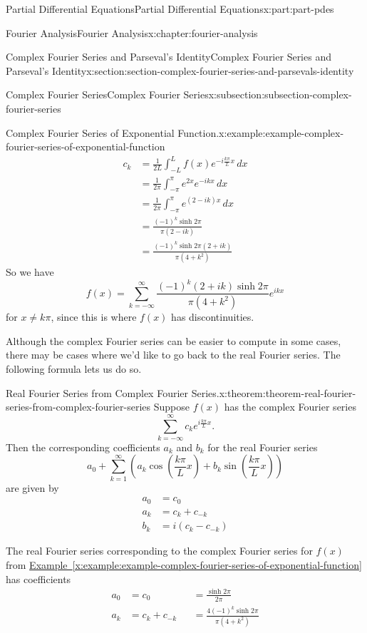 \documentclass[twoside,10pt,]{book}
\newcommand{\xreffont}{\relax}
\numberwithin{equation}{part}
\newcommand{\amp}{&}
\begin{document}
\begin{partptx}{Partial Differential Equations}{}{Partial Differential Equations}{}{}{x:part:part-pdes}
\begin{chapterptx}{Fourier Analysis}{}{Fourier Analysis}{}{}{x:chapter:fourier-analysis}
\begin{sectionptx}{Complex Fourier Series and Parseval's Identity}{}{Complex Fourier Series and Parseval's Identity}{}{}{x:section:section-complex-fourier-series-and-parsevals-identity}
\begin{subsectionptx}{Complex Fourier Series}{}{Complex Fourier Series}{}{}{x:subsection:subsection-complex-fourier-series}
\begin{example}{Complex Fourier Series of Exponential Function.}{x:example:example-complex-fourier-series-of-exponential-function}
\begin{align*}
c_{k} \amp = \frac{1}{2L}\int_{-L}^{L}f(x)e^{-i\frac{k\pi}{L}x}\,dx\\
\amp = \frac{1}{2\pi}\int_{-\pi}^{\pi}e^{2x}e^{-ikx}\,dx \\
\amp = \frac{1}{2\pi}\int_{-\pi}^{\pi}e^{(2-ik)x}\,dx \\
\amp = \frac{(-1)^{k}\sinh2\pi}{\pi(2-ik)} \\
\amp = \frac{(-1)^{k}\sinh2\pi(2+ik)}{\pi(4+k^{2})}
\end{align*}
So we have%
\begin{equation*}
f(x) = \sum_{k=-\infty}^{\infty}\frac{(-1)^{k}(2+ik)\sinh2\pi}{\pi(4+k^{2})}e^{ikx}
\end{equation*}
for \(x\neq k\pi\), since this is where \(f(x)\) has discontinuities.%
\end{example}
Although the complex Fourier series can be easier to compute in some cases, there may be cases where we'd like to go back to the real Fourier series. The following formula lets us do so.%
\begin{theorem}{Real Fourier Series from Complex Fourier Series.}{}{x:theorem:theorem-real-fourier-series-from-complex-fourier-series}%
%
Suppose \(f(x)\) has the complex Fourier series%
\begin{equation*}
\sum_{k=-\infty}^{\infty}c_{k}e^{i\frac{k\pi}{L}x}.
\end{equation*}
Then the corresponding coefficients \(a_{k}\) and \(b_{k}\) for the real Fourier series%
\begin{equation*}
a_{0} + \sum_{k=1}^{\infty}\left(a_{k}\cos\left(\frac{k\pi}{L}x\right)+b_{k}\sin\left(\frac{k\pi}{L}x\right)\right)
\end{equation*}
are given by%
\begin{align*}
a_{0} \amp = c_{0} \\
a_{k} \amp = c_{k} + c_{-k} \\
b_{k} \amp = i(c_{k}-c_{-k}) 
\end{align*}
%
\end{theorem}
The real Fourier series corresponding to the complex Fourier series for \(f(x)\) from \hyperref[x:example:example-complex-fourier-series-of-exponential-function]{Example~{\xreffont\ref{x:example:example-complex-fourier-series-of-exponential-function}}} has coefficients%
\begin{align*}
a_{0} \amp = c_{0} \amp \amp= \frac{\sinh2\pi}{2\pi} \\
a_{k} \amp = c_{k} + c_{-k} \amp \amp= \frac{4(-1)^{k}\sinh2\pi}{\pi(4+k^{2})} \\

\end{align*}
\end{subsectionptx}
\end{sectionptx}
\end{chapterptx}
\end{partptx}
\end{document}
